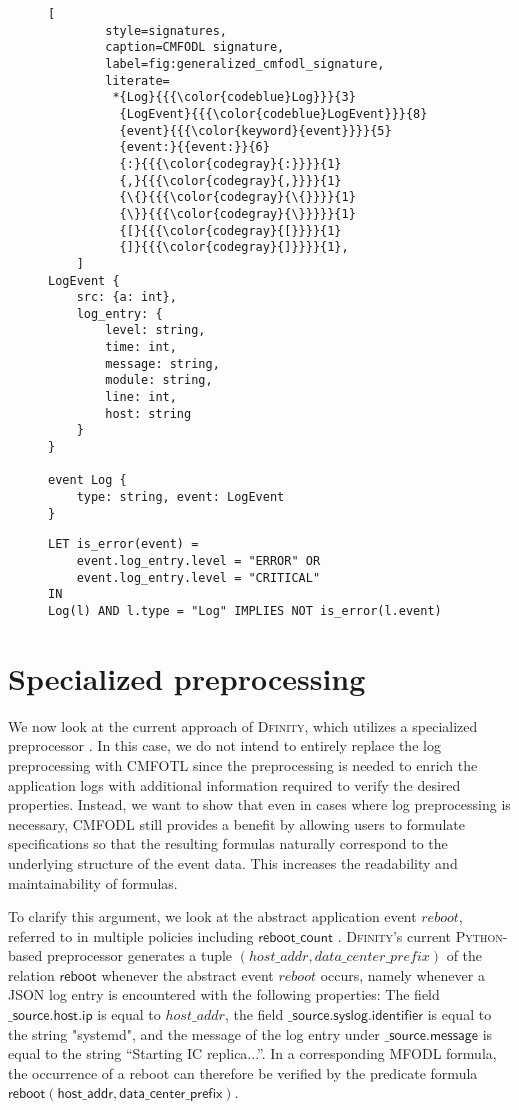 \begin{figure}[p]
	\begin{lstlisting}[
		style=signatures,
		caption=CMFODL signature,
		label=fig:generalized_cmfodl_signature,
		literate=
	     *{Log}{{{\color{codeblue}Log}}}{3}
	      {LogEvent}{{{\color{codeblue}LogEvent}}}{8}
	      {event}{{{\color{keyword}{event}}}}{5}
	      {event:}{{event:}}{6}
	      {:}{{{\color{codegray}{:}}}}{1}
	      {,}{{{\color{codegray}{,}}}}{1}
	      {\{}{{{\color{codegray}{\{}}}}{1}
	      {\}}{{{\color{codegray}{\}}}}}{1}
	      {[}{{{\color{codegray}{[}}}}{1}
	      {]}{{{\color{codegray}{]}}}}{1},
	]
LogEvent {
	src: {a: int},
	log_entry: {
		level: string,
		time: int,
		message: string,
		module: string,
		line: int,
		host: string
	}
}

event Log {
	type: string, event: LogEvent
}\end{lstlisting}
\end{figure}

\begin{figure}[p]
	\begin{lstlisting}[style=formula,caption=CMFODL formula,label=fig:generalized_cmfodl_formula]
LET is_error(event) =
	event.log_entry.level = "ERROR" OR
	event.log_entry.level = "CRITICAL"
IN
Log(l) AND l.type = "Log" IMPLIES NOT is_error(l.event)\end{lstlisting}
\end{figure}

\section{Specialized preprocessing}
We now look at the current approach of \textsc{Dfinity}, which utilizes a specialized preprocessor \cite{IcPolicymonitoringMaster}.  In this case, we do not intend to entirely replace the log preprocessing with CMFOTL since the preprocessing is needed to enrich the application logs with additional information required to verify the desired properties. Instead, we want to show that even in cases where log preprocessing is necessary, CMFODL still provides a benefit by allowing users to formulate specifications so that the resulting formulas naturally correspond to the underlying structure of the event data. This increases the readability and maintainability of formulas.

To clarify this argument, we look at the abstract application event $reboot$, referred to in multiple policies including $\mathsf{reboot\_count}$ \cite{IcPolicymonitoringMaster}. \textsc{Dfinity}'s current \textsc{Python}-based preprocessor generates a tuple $(host\_addr, data\_center\_prefix)$ of the relation $\mathsf{reboot}$ whenever the abstract event $reboot$ occurs, namely whenever a JSON log entry is encountered with the following properties: The field $\mathsf{\_source.host.ip}$ is equal to $host\_addr$, the field $\mathsf{\_source.syslog.identifier}$ is equal to the string "systemd", and the message of the log entry under $\mathsf{\_source.message}$ is equal to the string \enquote{Starting IC replica...}. In a corresponding MFODL formula, the occurrence of a reboot can therefore be verified by the predicate formula $\mathsf{reboot(host\_addr, data\_center\_prefix)}$.

